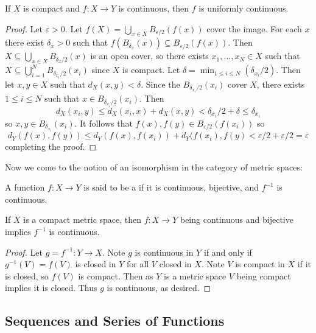 \begin{prop}\label{prop:3.1.4}
    If $X$ is compact and $f:X\rightarrow Y$ is continuous, then $f$ is uniformly continuous.
\end{prop}
\begin{proof}
    Let $\varepsilon >0$. Let $f(X) = \bigcup_{x \in X}B_{\varepsilon/2}(f(x))$ cover the image. For each $x$ there exist $\delta_x > 0$ such that $f(B_{\delta_x}(x)) \subseteq B_{\varepsilon/2}(f(x))$. Then $X \subseteq \bigcup_{x\in X}B_{\delta_x/2}(x)$ is an open cover, so there exists $x_1,...,x_N \in X$ such that $X \subseteq \bigcup_{i=1}^NB_{\delta_{x_i}/2}(x_i)$ since $X$ is compact. Let $\delta = \min_{1\leq i \leq N}(\delta_{x_i}/2)$. Then let $x,y \in X$ such that $d_X(x,y) < \delta$. Since the $B_{\delta_{x_i}/2}(x_i)$ cover $X$, there exists $1 \leq i \leq N$ such that $x \in B_{\delta_{x_i}/2}(x_i)$. Then $$d_X(x_i,y) \leq d_X(x_i,x) + d_X(x,y) < \delta_{x_i}/2+\delta \leq \delta_{x_i}$$ so $x,y \in B_{\delta_{x_i}}(x_i)$. It follows that $f(x),f(y) \in B_{\varepsilon/2}(f(x_i))$ so $$d_Y(f(x),f(y)) \leq d_Y(f(x),f(x_i)) + d_Y(f(x_i),f(y) < \varepsilon/2+\varepsilon/2 = \varepsilon$$
    completing the proof.
\end{proof}

Now we come to the notion of an isomorphism in the category of metric spaces:

\begin{defn}
    A function $f:X\rightarrow Y$ is said to be a  if it is continuous, bijective, and $f^{-1}$ is continuous.
\end{defn}

\begin{prop}\label{prop:3.1.5}
    If $X$ is a compact metric space, then $f:X\rightarrow Y$ being continuous and bijective implies $f^{-1}$ is continuous.
\end{prop}
\begin{proof}
    Let $g= f^{-1}:Y\rightarrow X$. Note $g$ is continuous in $Y$ if and only if $g^{-1}(V) = f(V)$ is closed in $Y$ for all $V$ closed in $X$. Note $V$ is compact in $X$ if it is closed, so $f(V)$ is compact. Then as $Y$ is a metric space $V$ being compact implies it is closed. Thus $g$ is continuous, as desired.
\end{proof}


\subsection{Sequences and Series of Functions}

